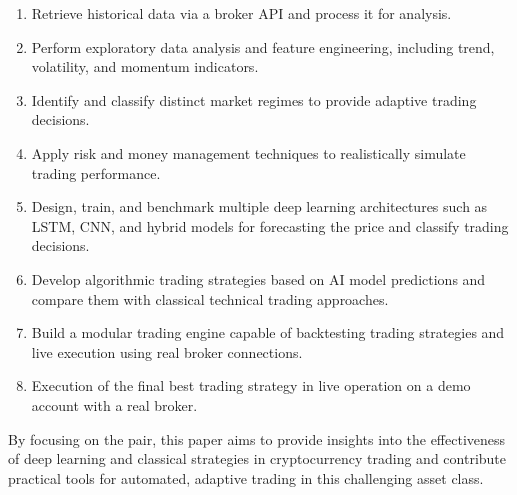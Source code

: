 \begin{enumerate}
    \item Retrieve historical \ethusdc data via a broker API and process it for analysis.
    \item Perform exploratory data analysis and feature engineering, including trend, volatility, and momentum indicators.
    \item Identify and classify distinct market regimes to provide adaptive trading decisions.
    \item Apply risk and money management techniques to realistically simulate trading performance.
    \item Design, train, and benchmark multiple deep learning architectures such as LSTM, CNN, and hybrid models for forecasting the price and classify trading decisions.
    \item Develop algorithmic trading strategies based on AI model predictions and compare them with classical technical trading approaches.
    \item Build a modular trading engine capable of backtesting trading strategies and live execution using real broker connections.
    \item Execution of the final best trading strategy in live operation on a demo account with a real broker.
\end{enumerate}


By focusing on the \ethusdc pair, this paper aims to provide insights into the effectiveness of deep learning and classical strategies in cryptocurrency trading and contribute practical tools for automated, adaptive trading in this challenging asset class.
